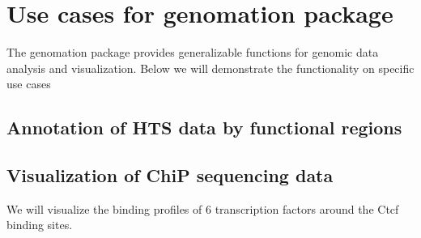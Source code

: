 \documentclass{article}\usepackage[]{graphicx}\usepackage[]{color}
\begin{document}
\section{Use cases for genomation package}
The genomation package provides generalizable functions for genomic data analysis
and visualization. Below we will demonstrate the functionality on specific use cases

\subsection{Annotation of HTS data by functional regions}


\subsection{Visualization of ChiP sequencing data}

We will visualize the binding profiles of 6 transcription factors around the 
Ctcf binding sites. 
\end{document}
